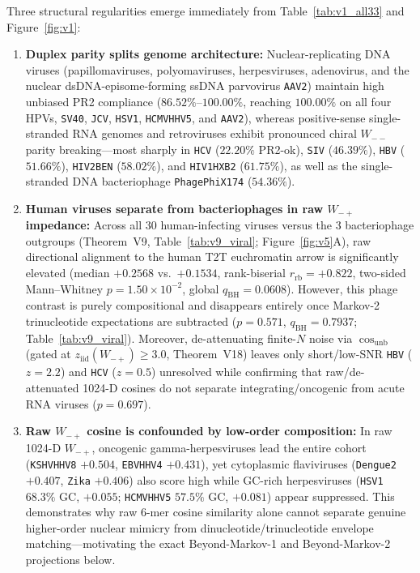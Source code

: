 \documentclass[11pt, a4paper]{article}
\DeclareRobustCommand{\_}{\textunderscore\allowbreak}
\begin{document}
Three structural regularities emerge immediately from Table~\ref{tab:v1_all33} and Figure~\ref{fig:v1}:
\begin{enumerate}
    \item \textbf{Duplex parity splits genome architecture:} Nuclear-replicating DNA viruses (papillomaviruses, polyomaviruses, herpesviruses, adenovirus, and the nuclear dsDNA-episome-forming ssDNA parvovirus \texttt{AAV2}) maintain high unbiased PR2 compliance ($86.52\%\text{--}100.00\%$, reaching $100.00\%$ on all four HPVs, \texttt{SV40}, \texttt{JCV}, \texttt{HSV1}, \texttt{HCMV\_HHV5}, and \texttt{AAV2}), whereas positive-sense single-stranded RNA genomes and retroviruses exhibit pronounced chiral $W_{--}$ parity breaking---most sharply in \texttt{HCV} ($22.20\%$ PR2-ok), \texttt{SIV} ($46.39\%$), \texttt{HBV} ($51.66\%$), \texttt{HIV2\_BEN} ($58.02\%$), and \texttt{HIV1\_HXB2} ($61.75\%$), as well as the single-stranded DNA bacteriophage \texttt{Phage\_PhiX174} ($54.36\%$).
    \item \textbf{Human viruses separate from bacteriophages in raw $W_{-+}$ impedance:} Across all 30 human-infecting viruses versus the 3 bacteriophage outgroups (Theorem~V9, Table~\ref{tab:v9_viral}; Figure~\ref{fig:v5}A), raw directional alignment to the human T2T euchromatin arrow is significantly elevated (median $+0.2568$ vs.\ $+0.1534$, rank-biserial $r_{\mathrm{rb}} = +0.822$, two-sided Mann--Whitney $p = 1.50 \times 10^{-2}$, global $q_{\mathrm{BH}} = 0.0608$). However, this phage contrast is purely compositional and disappears entirely once Markov-2 trinucleotide expectations are subtracted ($p = 0.571$, $q_{\mathrm{BH}} = 0.7937$; Table~\ref{tab:v9_viral}). Moreover, de-attenuating finite-$N$ noise via $\cos_{\mathrm{unb}}$ (gated at $z_{\mathrm{iid}}(W_{-+}) \ge 3.0$, Theorem~V18) leaves only short/low-SNR \texttt{HBV} ($z = 2.2$) and \texttt{HCV} ($z = 0.5$) unresolved while confirming that raw/de-attenuated 1024-D cosines do not separate integrating/oncogenic from acute RNA viruses ($p = 0.697$).
    \item \textbf{Raw $W_{-+}$ cosine is confounded by low-order composition:} In raw 1024-D $W_{-+}$, oncogenic gamma-herpesviruses lead the entire cohort (\texttt{KSHV\_HHV8} $+0.504$, \texttt{EBV\_HHV4} $+0.431$), yet cytoplasmic flaviviruses (\texttt{Dengue2} $+0.407$, \texttt{Zika} $+0.406$) also score high while GC-rich herpesviruses (\texttt{HSV1} $68.3\%$ GC, $+0.055$; \texttt{HCMV\_HHV5} $57.5\%$ GC, $+0.081$) appear suppressed. This demonstrates why raw 6-mer cosine similarity alone cannot separate genuine higher-order nuclear mimicry from dinucleotide/trinucleotide envelope matching---motivating the exact Beyond-Markov-1 and Beyond-Markov-2 projections below.
\end{enumerate}
\end{document}
